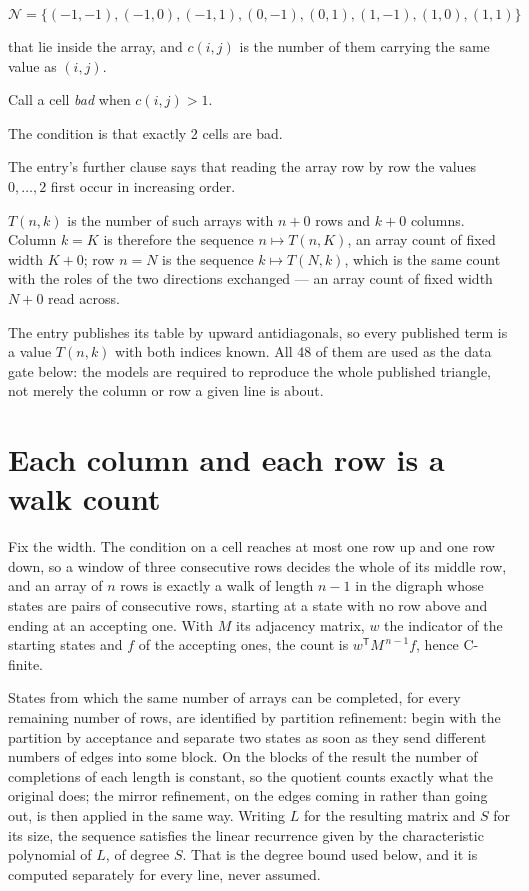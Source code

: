 \documentclass[11pt]{article}
\theoremstyle{definition}
\begin{document}
\[\mathcal{N} = \{(-1,-1), (-1,0), (-1,1), (0,-1), (0,1), (1,-1), (1,0), (1,1)\}\]

that lie inside the array, and $c(i,j)$ is the number of them carrying the same value as $(i,j)$.

Call a cell {\itshape bad} when $c(i,j) > 1$.

The condition is that exactly 2 cells are bad.

The entry's further clause says that reading the array row by row the values $0,\dots,2$ first occur in increasing order.

$T(n,k)$ is the number of such arrays with $n + 0$ rows and $k + 0$ columns. Column $k = K$ is therefore the sequence $n \mapsto T(n,K)$, an array count of fixed width $K + 0$; row $n = N$ is the sequence $k \mapsto T(N,k)$, which is the same count with the roles of the two directions exchanged --- an array count of fixed width $N + 0$ read across.

The entry publishes its table by upward antidiagonals, so every published term is a value $T(n,k)$ with both indices known. All 48 of them are used as the data gate below: the models are required to reproduce the whole published triangle, not merely the column or row a given line is about.

\section{Each column and each row is a walk count}

Fix the width. The condition on a cell reaches at most one row up and one row down, so a window of three consecutive rows decides the whole of its middle row, and an array of $n$ rows is exactly a walk of length $n-1$ in the digraph whose states are pairs of consecutive rows, starting at a state with no row above and ending at an accepting one. With $M$ its adjacency matrix, $w$ the indicator of the starting states and $f$ of the accepting ones, the count is $w^{\mathsf T}M^{\,n-1}f$, hence C-finite.

States from which the same number of arrays can be completed, for every remaining number of rows, are identified by partition refinement: begin with the partition by acceptance and separate two states as soon as they send different numbers of edges into some block. On the blocks of the result the number of completions of each length is constant, so the quotient counts exactly what the original does; the mirror refinement, on the edges coming in rather than going out, is then applied in the same way. Writing $L$ for the resulting matrix and $S$ for its size, the sequence satisfies the linear recurrence given by the characteristic polynomial of $L$, of degree $S$. That is the degree bound used below, and it is computed separately for every line, never assumed.
\end{document}
